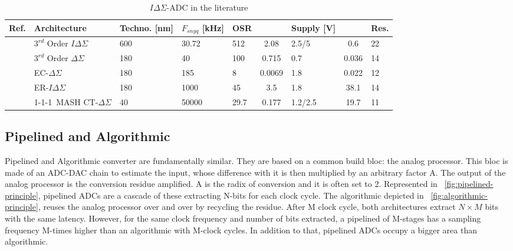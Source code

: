 \begin{table}[htp]
	\caption{\(I\Delta\Sigma \)-ADC in the literature}
	\centering
	\label{table:sigma_delta_comparison_table}
	\begin{tabular}{L{3.5\charwidth} R{16.5\charwidth} R{6\charwidth} C{5\charwidth} R{4\charwidth} S[table-format=2.2, table-column-width=6\charwidth] R{6\charwidth} S[table-format=2.2, table-column-width=6\charwidth] C{3.5\charwidth}}
	\toprule
	Ref. & Architecture & Techno. [nm] & \(F_{snyq}\) [kHz] & OSR & {} & Supply [V] & {} & Res. \\ 
	\midrule
	\cite{Quiquempoix2006} & \(3^{rd}\) Order \(I\Delta\Sigma \) & 600 & 30.72 & 512 & 2.08 & 2.5/5 & 0.6 & 22 \\
	\cite{Chae2009} & \(3^{rd}\) Order \(\Delta\Sigma \) & 180 & 40 & 100 & 0.715 & 0.7 & 0.036 & 14 \\
	\cite{Jeon2017} & EC-\(\Delta\Sigma \) & 180 & 185 & 8 & 0.0069 & 1.8 & 0.022 & 12 \\
	\cite{Agah2010} & ER-\(I\Delta\Sigma \) & 180 & 1000 & 45 & 3.5 & 1.8 & 38.1 & 14 \\
	\cite{Liu2017} & 1-1-1~MASH CT-\(\Delta\Sigma \) & 40 & 50000 & 29.7 & 0.177 & 1.2/2.5 & 19.7 & 11 \\
	\bottomrule
	\end{tabular}
\end{table}

\subsection{Pipelined and Algorithmic}               %
\label{sec:pipe-adc}
Pipelined and Algorithmic converter are fundamentally similar. They are based on a common build bloc: the analog processor. This bloc is made of an ADC-DAC chain to estimate the input, whose difference with it is then multiplied by an arbitrary factor A. The output of the analog processor is the conversion residue amplified. A is the radix of conversion and it is often set to 2. Represented in \figurename~\ref{fig:pipelined-principle}, pipelined ADCs are a cascade of these extracting N-bits for each clock cycle. The algorithmic depicted in \figurename~\ref{fig:algorithmic-principle}, reuses the analog processor over and over by recycling the residue. After M clock cycle, both architectures extract $N\times M$ bits with the same latency. However, for the same clock frequency and number of bits extracted, a pipelined of M-stages has a sampling frequency M-times higher than an algorithmic with M-clock cycles. In addition to that, pipelined ADCs occupy a bigger area than algorithmic.

